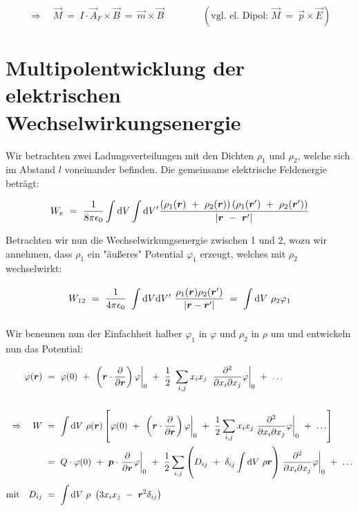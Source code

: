 \begin{equation*}
\Rightarrow \quad \vec{M}  \ = \ I\cdot \vec{A}_F \times \vec{B} \ = \ \vec{m}\times\vec{B} \qquad\qquad (\text{vgl. el. Dipol: } \vec{M}  \ = \ \vec{p}\times\vec{E})
\end{equation*}

\section[Multipolentwicklung der Feldenergie]{Multipolentwicklung der elektrischen Wechselwirkungsenergie}

Wir betrachten zwei Ladungsverteilungen mit den Dichten $\rho_1$ und $\rho_2$, welche sich im Abstand $l$ voneinander befinden. Die gemeinsame elektrische Feldenergie beträgt:

\begin{equation*}
W_e \ = \ \frac{1}{8\pi\epsilon_0}\int\d V \int\d V' \frac{\left(\rho_1(\vec{r}) \ + \ \rho
_2(\vec{r})\right)\left(\rho_1 (\vec{r}') \ + \ \rho_2(\vec{r}')\right)}{|\vec{r} \ - \ \vec{r}'|}
\end{equation*}

Betrachten wir nun die Wechselwirkungsenergie zwischen 1 und 2, wozu wir annehmen, dass $\rho_1$ ein "äußeres" Potential $\varphi_1$ erzeugt, welches mit $\rho_2$ wechselwirkt:

\begin{equation*}
W_{12} \ = \  \frac{1}{4\pi\epsilon_0} \ \int\d V \d V' \ \frac{\rho_1(\vec{r})\rho_2(\vec{r}')}{|\vec{r}-\vec{r}'|} \ = \ \Int{}{}{V} \rho_2\varphi_1
\end{equation*}

Wir benennen nun der Einfachheit halber $\varphi_1$ in $\varphi$ und $\rho_2$ in $\rho$ um und entwickeln nun das Potential:

\begin{align*}
\varphi(\vec{r})  \ &= \  \varphi(0) \ + \ \left.\left(\vec{r}\cdot\pdiff{}{\vec{r}}\right)\varphi\right|_0 \ + \ \frac{1}{2}\ \sum_{i,j} x_i x_j \ \left.\frac{\partial ^2}{\partial x_i  \partial x_j}\varphi\right|_0 \ + \ \ldots \\
\ \\
\Rightarrow \quad W \ &= \ \Int{}{}{V}\rho(\vec{r})\left[\varphi(0) \ + \ \left.\left(\vec{r}\cdot\pdiff{}{\vec{r}}\right)\varphi\right|_0 \ + \ \frac{1}{2} \sum_{i,j}x_i x_j \left.\frac{\partial^2}{\partial x_i \partial x_j}\varphi\right|_0 \ + \ \ldots\right]\\
&= \ Q\cdot\varphi(0) \ + \ \vec{p}\cdot\left.\pdiff{}{\vec{r}}\varphi\right|_0 \ + \ \frac{1}{2}\sum_{i,j}\left(D_{ij} \ + \ \delta_{ij}\Int{}{}{V}\rho\vec{r}\right)\left.\frac{\partial^2}{\partial x_i \partial x_j}\varphi\right|_0 \ + \ \ldots\\
\text{mit} \quad D_{ij} \ &= \ \Int{}{}{V} \rho \ \left(3x_i x_j\ - \ \vec{r}^2\delta_{ij}\right)
\end{align*}

